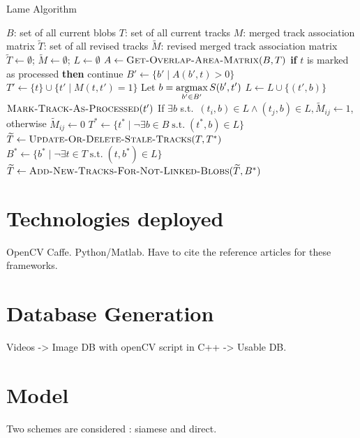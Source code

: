 \begin{algorithm}
\caption{Lame Algorithm}
\label{lame-algorithm}
\begin{algorithmic}
  \REQUIRE $B$: set of all current blobs
  \REQUIRE $T$: set of all current tracks
  \REQUIRE $M$: merged track association matrix
  \ENSURE $\widetilde{T}$: set of all revised tracks
  \ENSURE $\widetilde{M}$: revised merged track association matrix
  \STATE $\widetilde{T} \gets \emptyset$; $\widetilde{M} \gets \emptyset$; $L \gets \emptyset$
  \STATE $A \gets \textsc{Get-Overlap-Area-Matrix}(B, T)$
    \STATE \textbf{if} $t$ is marked as processed \textbf{then} continue
    \STATE $B' \gets \{ b' \mid A(b', t) > 0 \}$ 
    \STATE $T' \gets \{ t \} \cup \{ t' \mid M(t, t') = 1 \}$ 
        \STATE Let $b = \displaystyle\operatorname*{argmax}_{b' \in B'} S(b', t')$
        \STATE $L \gets L \cup \{ (t', b) \}$
        \STATE $\textsc{Mark-Track-As-Processed}(t')$
      \ENDFOR
    \ENDIF
  \ENDFOR
    \STATE If $\exists b$ s.t.\ $(t_i, b) \in L \wedge (t_j, b) \in L, \widetilde{M}_{ij} \gets 1$, otherwise $\widetilde{M}_{ij} \gets 0$
  \ENDFOR
  \STATE $T^* \gets \{ t^* \mid \neg\exists b \in B \;\text{s.t.}\; (t^*,b) \in L \}$ 
  \STATE $\widetilde{T} \gets \textsc{Update-Or-Delete-Stale-Tracks}(T,T^*)$
  \STATE $B^* \gets \{ b^* \mid \neg \exists t \in T \;\text{s.t.}\; (t, b^*) \in L \}$ 
  \STATE $\widetilde{T} \gets\textsc{Add-New-Tracks-For-Not-Linked-Blobs}(\widetilde{T},B^*)$
\end{algorithmic}
\end{algorithm}






\section{Technologies deployed}
OpenCV Caffe. Python/Matlab. Have to cite the reference articles for these frameworks.

\section{Database Generation}

Videos -> Image DB with openCV script in C++ -> Usable DB.

\section{Model}

Two schemes are considered : siamese and direct.

\FloatBarrier
